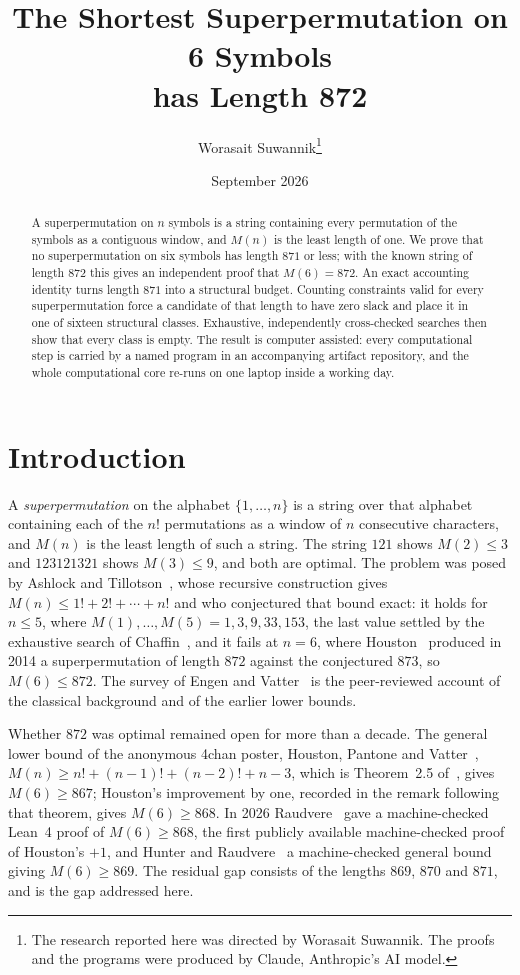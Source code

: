 \documentclass[10pt]{article}
\title{\textbf{The Shortest Superpermutation on 6 Symbols\\ has Length 872}}
\author{Worasait Suwannik\thanks{The research reported here was directed by Worasait Suwannik.  The proofs and the programs were produced by Claude, Anthropic's AI model.}}
\date{September 2026}
\theoremstyle{remark}
\theoremstyle{plain}
\begin{document}
\maketitle

\begin{abstract}
A superpermutation on $n$ symbols is a string containing every
permutation of the symbols as a contiguous window, and $M(n)$ is the
least length of one.  We prove that no superpermutation on six symbols
has length $871$ or less; with the known string of length $872$ this
gives an independent proof that $M(6)=872$.  An exact
accounting identity turns length $871$ into a structural budget.
Counting constraints valid for every superpermutation force a candidate
of that length to have zero slack and place it in one of sixteen
structural classes.  Exhaustive, independently cross-checked searches
then show that every class is empty.  The result is computer assisted:
every
computational step is carried by a named program in an accompanying
artifact repository, and the whole computational core re-runs on one
laptop inside a working day.
\end{abstract}

\section{Introduction}\label{sec:intro}

A \emph{superpermutation} on the alphabet $\{1,\dots,n\}$ is a string
over that alphabet containing each of the $n!$ permutations as a window
of $n$ consecutive characters, and $M(n)$ is the least length of such a
string.  The string $121$ shows $M(2)\le 3$ and $123121321$ shows
$M(3)\le 9$, and both are optimal.  The problem was posed by Ashlock
and Tillotson~\cite{AT93}, whose recursive construction gives
$M(n)\le 1!+2!+\cdots+n!$ and who conjectured that bound exact: it
holds for $n\le 5$, where $M(1),\dots,M(5)=1,3,9,33,153$, the last
value settled by the exhaustive search of Chaffin~\cite{C14}, and it
fails at $n=6$, where Houston~\cite{Houston14} produced in 2014 a
superpermutation of length $872$ against the conjectured $873$, so
$M(6)\le 872$.  The survey of Engen and Vatter~\cite{EV21} is the peer-reviewed
account of the classical background and of the earlier lower bounds.

Whether $872$ was optimal remained open for more than a decade.  The general lower
bound of the anonymous 4chan poster, Houston, Pantone and
Vatter~\cite{HPV18}, $M(n)\ge n!+(n-1)!+(n-2)!+n-3$, which is
Theorem~2.5 of~\cite{EV21}, gives $M(6)\ge 867$; Houston's improvement
by one, recorded in the remark following that theorem, gives
$M(6)\ge 868$.  In 2026 Raudvere~\cite{R26} gave a machine-checked
Lean~4 proof of $M(6)\ge 868$, the first publicly available
machine-checked proof of Houston's $+1$, and Hunter and Raudvere~\cite{HR26} a machine-checked general
bound giving $M(6)\ge 869$.  The residual gap consists of the lengths
$869$, $870$ and $871$, and is the gap addressed here.
\end{document}
